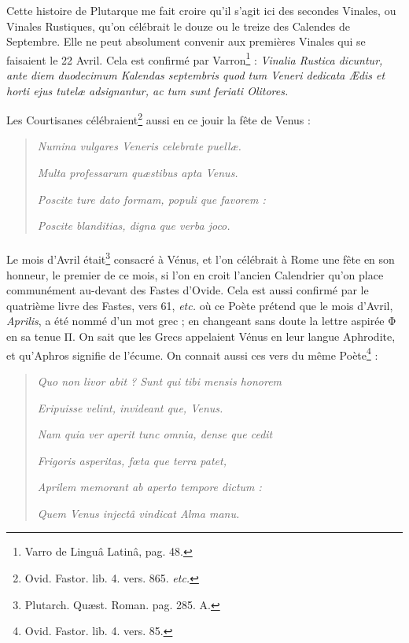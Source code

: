 \documentclass[a4paper, 11pt, oneside, polutonikogreek, french]{article}
\begin{document}
Cette histoire de Plutarque me fait croire qu'il s'agit ici des secondes Vinales, ou Vinales Rustiques, qu'on célébrait le douze ou le treize des Calendes de Septembre. Elle ne peut absolument convenir aux premières Vinales qui se faisaient le 22 Avril. Cela est confirmé par Varron\footnote{Varro de Linguâ Latinâ, pag. 48.} : \emph{Vinalia Rustica dicuntur, ante diem duodecimum Kalendas septembris quod tum Veneri dedicata Ædis et horti ejus tutelæ adsignantur, ac tum sunt feriati Olitores.}

Les Courtisanes célébraient\footnote{Ovid. Fastor. lib. 4. vers. 865. \emph{etc.}} aussi en ce jouir la fête de Venus :
\begin{quotation}
\emph{Numina vulgares Veneris celebrate puellæ.}

\hspace*{5mm}\emph{Multa professarum quæstibus apta Venus.}

\emph{Poscite ture dato formam, populi que favorem :}

\hspace*{5mm}\emph{Poscite blanditias, digna que verba joco.}
\end{quotation}
\paragraph{}
Le mois d'Avril était\footnote{Plutarch. Quæst. Roman. pag. 285. A.} consacré à Vénus, et l'on célébrait à Rome une fête en son honneur, le premier de ce mois, si l'on en croit l'ancien Calendrier qu'on place communément au-devant des Fastes d'Ovide. Cela est aussi confirmé par le quatrième livre des Fastes, vers 61, \emph{etc.} où ce Poète prétend que le mois d'Avril, \emph{Aprilis}, a été nommé d'un mot grec ; en changeant sans doute la lettre aspirée Φ en sa tenue Π. On sait que les Grecs appelaient Vénus en leur langue Aphrodite, et qu'Aphros signifie de l'écume. On connait aussi ces vers du même Poète\footnote{Ovid. Fastor. lib. 4. vers. 85.} :
\begin{quotation}
\emph{Quo non livor abit ? Sunt qui tibi mensis honorem}

\hspace*{5mm}\emph{Eripuisse velint, invideant que, Venus.}

\emph{Nam quia ver aperit tunc omnia, dense que cedit}

\hspace*{5mm}\emph{Frigoris asperitas, fœta que terra patet,}

\emph{Aprilem memorant ab aperto tempore dictum :}

\hspace*{5mm}\emph{Quem Venus injectâ vindicat Alma manu.}
\end{quotation}
\end{document}
